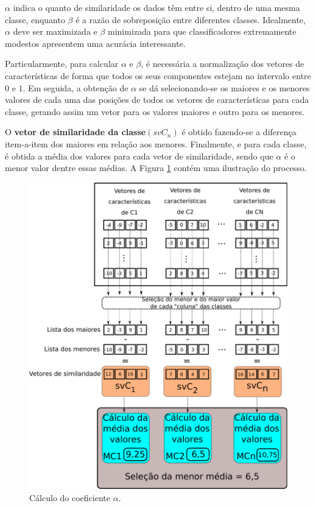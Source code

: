 				\par $\alpha$ indica o quanto de similaridade os dados têm entre si, dentro de uma mesma classe, enquanto $\beta$ é a razão de sobreposição entre diferentes classes. Idealmente, $\alpha$ deve ser maximizada e $\beta$ minimizada para que classificadores extremamente modestos apresentem uma acurácia interessante.
				
				\par Particularmente, para calcular $\alpha$ e $\beta$, é necessária a normalização dos vetores de características de forma que todos os seus componentes estejam no intervalo entre $0$ e $1$. Em seguida, a obtenção de $\alpha$ se dá selecionando-se os maiores e os menores valores de cada uma das posições de todos os vetores de características para cada classe, gerando assim um vetor para os valores maiores e outro para os menores.
				
				\par O \textbf{vetor de similaridade da classe}$(svC_n)$ é obtido fazendo-se a diferença item-a-item dos maiores em relação aos menores. Finalmente, e para cada classe, é obtida a média dos valores para cada vetor de similaridade, sendo que $\alpha$ é o menor valor dentre essas médias. A Figura \ref{fig:calculoalpha} contém uma ilustração do processo.
				
				\begin{figure}
					\centering
		       	\includegraphics[width=0.77\linewidth]{images/calculoAlpha.pdf}
					\caption{Cálculo do coeficiente $\alpha$.}
					\label{fig:calculoalpha}
				\end{figure}
				
